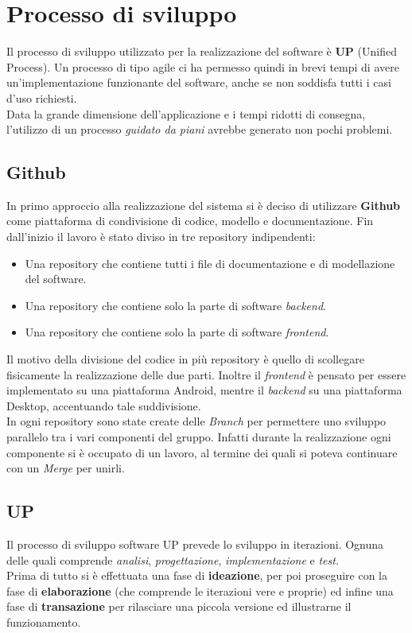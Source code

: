 \chapter{Processo di sviluppo}
Il processo di sviluppo utilizzato per la realizzazione del software è \textbf{UP} (Unified Process). Un processo di tipo agile ci ha permesso quindi in brevi tempi di avere un'implementazione funzionante del software, anche se non soddisfa tutti i casi d'uso richiesti.
\\Data la grande dimensione dell'applicazione e i tempi ridotti di consegna, l'utilizzo di un processo \textit{guidato da piani} avrebbe generato non pochi problemi.

\section{Github}
In primo approccio alla realizzazione del sistema si è deciso di utilizzare \textbf{Github} come piattaforma di condivisione di codice, modello e documentazione. Fin dall'inizio il lavoro è stato diviso in tre repository indipendenti:
\begin{itemize}
	\item Una repository che contiene tutti i file di documentazione e di modellazione del software.
	\item Una repository che contiene solo la parte di software \textit{backend}. 
	\item Una repository che contiene solo la parte di software \textit{frontend}.
\end{itemize}
Il motivo della divisione del codice in più repository è quello di scollegare fisicamente la realizzazione delle due parti. Inoltre il \textit{frontend} è pensato per essere implementato su una piattaforma Android, mentre il \textit{backend} su una piattaforma Desktop, accentuando tale suddivisione.
\\In ogni repository sono state create delle \textit{Branch} per permettere uno sviluppo parallelo tra i vari componenti del gruppo. Infatti durante la realizzazione ogni componente si è occupato di un lavoro, al termine dei quali si poteva continuare con un \textit{Merge} per unirli.

\section{UP}
Il processo di sviluppo software UP prevede lo sviluppo in iterazioni. Ognuna delle quali comprende \textit{analisi}, \textit{progettazione}, \textit{implementazione} e \textit{test}.
\\Prima di tutto si è effettuata una fase di \textbf{ideazione}, per poi proseguire con la fase di \textbf{elaborazione} (che comprende le iterazioni vere e proprie) ed infine una fase di \textbf{transazione} per rilasciare una piccola versione ed illustrarne il funzionamento.

